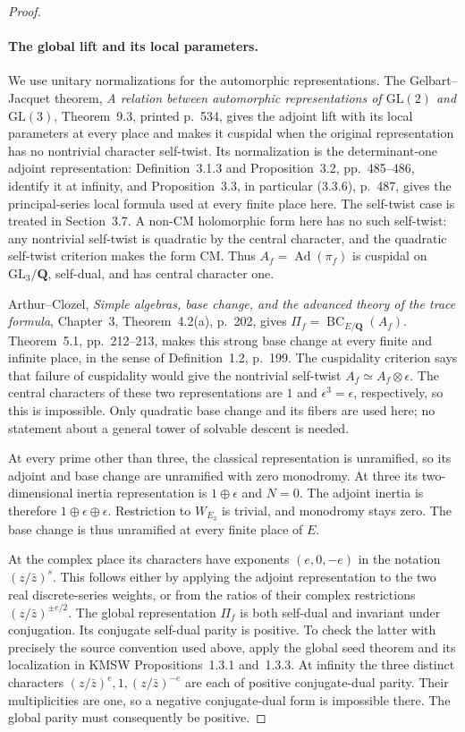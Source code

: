 \begin{proof}
\paragraph{The global lift and its local parameters.}
We use unitary normalizations for the automorphic representations.
The Gelbart--Jacquet theorem, \emph{A relation between automorphic
representations of $\mathrm{GL}(2)$ and $\mathrm{GL}(3)$},
Theorem~9.3, printed p.~534, gives the adjoint lift with its local
parameters at every place and makes it cuspidal when the original
representation has no nontrivial character self-twist.  Its
normalization is the determinant-one adjoint representation:
Definition~3.1.3 and Proposition~3.2, pp.~485--486, identify it
at infinity, and Proposition~3.3, in particular (3.3.6), p.~487,
gives the principal-series local formula used at every finite
place here.  The self-twist case is treated in Section~3.7.
A non-CM holomorphic form here has no such self-twist:
any nontrivial self-twist is quadratic by the central character,
and the quadratic self-twist criterion makes the form CM.
Thus $A_f=\operatorname{Ad}(\pi_f)$ is cuspidal on
$\mathrm{GL}_3/\mathbf Q$, self-dual, and has central character one.

Arthur--Clozel, \emph{Simple algebras, base change, and the
advanced theory of the trace formula}, Chapter~3,
Theorem~4.2(a), p.~202, gives
$\Pi_f=\operatorname{BC}_{E/\mathbf Q}(A_f)$.
Theorem~5.1, pp.~212--213, makes this strong base change at
every finite and infinite place, in the sense of Definition~1.2,
p.~199.  The cuspidality criterion says that failure of
cuspidality would give the
nontrivial self-twist $A_f\simeq A_f\otimes\epsilon$.
The central characters of these two representations are $1$
and $\epsilon^3=\epsilon$, respectively, so this is impossible.
Only quadratic base change and its fibers are used here;
no statement about a general tower of solvable descent is needed.

At every prime other than three, the classical representation
is unramified, so its adjoint and base change are unramified
with zero monodromy.  At three its two-dimensional inertia
representation is $1\oplus\epsilon$ and $N=0$.  The adjoint
inertia is therefore $1\oplus\epsilon\oplus\epsilon$.
Restriction to $W_{E_3}$ is trivial, and monodromy stays zero.
The base change is thus unramified at every finite place of $E$.

At the complex place its characters have exponents
$(e,0,-e)$ in the notation $(z/\bar z)^s$.  This follows either
by applying the adjoint representation to the two real
discrete-series weights, or from the ratios of their complex
restrictions $(z/\bar z)^{\pm e/2}$.
The global representation $\Pi_f$ is both self-dual and invariant
under conjugation.  Its conjugate self-dual parity is positive.
To check the latter with precisely the source convention used
above, apply the global seed theorem and its localization in
KMSW Propositions~1.3.1 and~1.3.3.  At infinity the three
distinct characters $(z/\bar z)^e,1,(z/\bar z)^{-e}$
are each of positive conjugate-dual parity.  Their multiplicities
are one, so a negative conjugate-dual form is impossible there.
The global parity must consequently be positive.


\end{proof}
